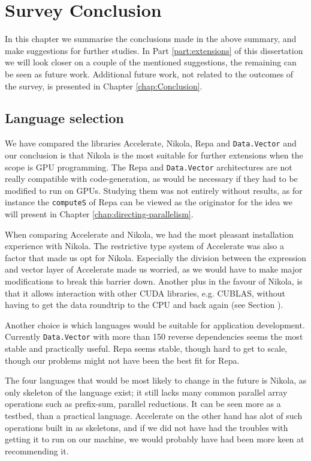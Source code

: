 \chapter{Survey Conclusion}
In this chapter we summarise the conclusions made in the above
summary, and make suggestions for further studies. In Part
\ref{part:extensions} of this dissertation we will look closer on a
couple of the mentioned suggestions, the remaining can be seen as
future work. Additional future work, not related to the outcomes of
the survey, is presented in Chapter \ref{chap:Conclusion}.

\section{Language selection}
We have compared the libraries Accelerate, Nikola, Repa and
\texttt{Data.Vector} and our conclusion is that Nikola is the most
suitable for further extensions when the scope is GPU programming. The
Repa and \texttt{Data.Vector} architectures are not really compatible
with code-generation, as would be necessary if they had to be modified
to run on GPUs. Studying them was not entirely without results, as for
instance the \texttt{computeS} of Repa can be viewed as the originator
for the idea we will present in Chapter
\ref{chap:directing-parallelism}.

When comparing Accelerate and Nikola, we had the most pleasant
installation experience with Nikola. The restrictive type system of
Accelerate was also a factor that made us opt for Nikola. Especially
the division between the expression and vector layer of Accelerate
made us worried, as we would have to make major modifications to break
this barrier down. Another plus in the favour of Nikola, is that it
allows interaction with other CUDA libraries, e.g. CUBLAS, without
having to get the data roundtrip to the CPU and back again (see
Section ).

Another choice is which languages would be suitable for application
development. Currently \texttt{Data.Vector} with more than 150 reverse
dependencies seems the most stable and practically useful. Repa seems
stable, though hard to get to scale, though our problems might not
have been the best fit for Repa.

The four languages that would be most likely to change in the future
is Nikola, as only skeleton of the language exist; it still lacks many
common parallel array operations such as prefix-sum, parallel
reductions. It can be seen more as a testbed, than a practical
language. Accelerate on the other hand has alot of such operations
built in as skeletons, and if we did not have had the troubles with
getting it to run on our machine, we would probably have had been more
keen at recommending it.

